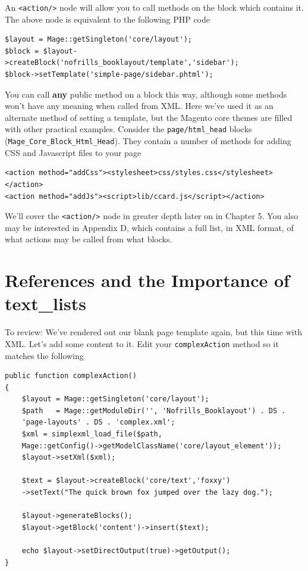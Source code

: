 \documentclass[oneside]{book}
\begin{document}
An \footnotesize\texttt{\textless action/\textgreater } \normalsize  node will allow you to call methods on the block which contains it.  The above node is equivalent to the following PHP code

\begin{lstlisting}
$layout = Mage::getSingleton('core/layout');
$block = $layout->createBlock('nofrills_booklayout/template','sidebar');
$block->setTemplate('simple-page/sidebar.phtml');

\end{lstlisting}


You can call \textbf{any} public method on a block this way, although some methods won't have any meaning when called from XML.  Here we've used it as an alternate method of setting a template, but the Magento core themes are filled with other practical examples.  Consider the \footnotesize\texttt{page/html\_head} \normalsize  blocks (\footnotesize\texttt{Mage\_Core\_Block\_Html\_Head}\normalsize).  They contain a number of methods for adding CSS and Javascript files to your page

\begin{lstlisting}
<action method="addCss"><stylesheet>css/styles.css</stylesheet></action>
<action method="addJs"><script>lib/ccard.js</script></action>

\end{lstlisting}


We'll cover the \footnotesize\texttt{\textless action/\textgreater } \normalsize  node in greater depth later on in Chapter 5.  You also may be interested in Appendix D, which contains a full list, in XML format, of what actions may be called from what blocks. 

\section{References and the Importance of text\_lists}

To review: We've rendered out our blank page template again, but this time with XML.  Let's add some content to it.  Edit your \footnotesize\texttt{complexAction} \normalsize  method so it matches the following

\begin{lstlisting}
public function complexAction()
{       
    $layout = Mage::getSingleton('core/layout');
    $path   = Mage::getModuleDir('', 'Nofrills_Booklayout') . DS . 
    'page-layouts' . DS . 'complex.xml';
    $xml = simplexml_load_file($path,
    Mage::getConfig()->getModelClassName('core/layout_element'));
    $layout->setXml($xml);

    $text = $layout->createBlock('core/text','foxxy')
    ->setText("The quick brown fox jumped over the lazy dog.");

    $layout->generateBlocks();      
    $layout->getBlock('content')->insert($text);

    echo $layout->setDirectOutput(true)->getOutput();                               
}

\end{lstlisting}
\end{document}
